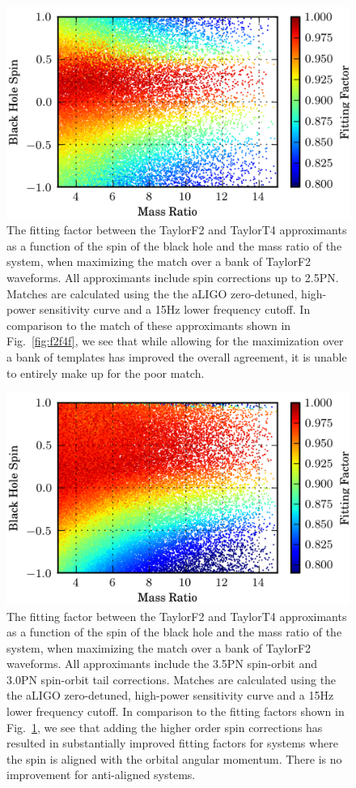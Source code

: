 \begin{figure}
\includegraphics{papers/nsbh_faithfulness/figure13.png}
\caption{\label{fig:spin2q}The fitting factor between the TaylorF2 and
TaylorT4 approximants as a function of the spin of the black hole
and the mass ratio of the system, when maximizing the match over a bank of
TaylorF2 waveforms. All approximants include spin corrections up to 2.5\ac{PN}.
Matches are calculated using the the aLIGO
zero-detuned, high-power sensitivity curve and a 15Hz lower frequency cutoff. In 
comparison to the match of these approximants shown in Fig.~\ref{fig:f2f4f}, we see that
while allowing for the maximization over a bank of templates has improved the overall agreement, 
it is unable to entirely make up for the poor match. 
}
\end{figure}

\begin{figure}
\includegraphics{papers/nsbh_faithfulness/figure14.png}
\caption{\label{fig:spin2q7}The fitting factor between the TaylorF2 and
TaylorT4 approximants as a function of the spin of the black hole
and the mass ratio of the system, when maximizing the match over a bank of
TaylorF2 waveforms. All approximants include the 3.5\ac{PN} spin-orbit and 3.0\ac{PN} 
spin-orbit tail corrections. 
Matches are calculated using the the aLIGO
zero-detuned, high-power sensitivity curve and a 15Hz lower frequency cutoff. In 
comparison to the fitting factors shown in Fig.~\ref{fig:spin2q}, we see that adding
the higher order spin corrections has resulted in substantially improved fitting factors for 
systems where the spin is aligned with the orbital angular momentum. There is no 
improvement for anti-aligned systems.
}
\end{figure}


